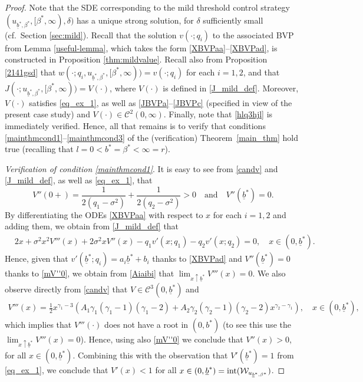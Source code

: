 \documentclass[11pt]{article} %
\def\ub{\underline{b}}
\numberwithin{komcounter}{section}
\begin{document}
\begin{proof} 
Note that the SDE corresponding to the mild threshold control strategy $(u_{\ub^*,\beta^*},[\beta^*,\infty),\delta)$ has a unique strong  solution, for $\delta$ sufficiently small (cf.~Section \ref{sec:mild}).
Recall that the solution $v(\cdot;q_i)$ to the associated BVP from Lemma \ref{useful-lemma}, which takes the form \eqref{XBVPaa}--\eqref{XBVPad}, is constructed in Proposition \ref{thm:mildvalue}. 
Recall also from Proposition \ref{2141gsd} that $w(\cdot;q_i,u_{\ub^*,\beta^*},[\beta^*,\infty)) = v(\cdot;q_i)$ for each $i=1,2$, and  
that $J(\cdot;u_{\ub^*,\beta^*},[\beta^*,\infty)) = V(\cdot)$, where $V(\cdot)$ is defined in \eqref{J_mild_def}. Moreover, $V(\cdot)$ satisfies \eqref{eq_ex_1}, as well as \eqref{JBVPa}--\eqref{JBVPc} (specified in view of the present case study) and $V(\cdot) \in \mathcal{C}^2(0,\infty)$. 
Finally, note that \eqref{hlq3hjl} is immediately verified. 
Hence, all that remains is to verify that conditions \eqref{mainthmcond1}--\eqref{mainthmcond3} of the (verification) Theorem~\ref{main_thm}  hold true (recalling that $l=0<b^*=\beta^*<\infty=r$).

\vspace{1mm}
{\it Verification of condition \eqref{mainthmcond1}}. 
It is easy to see from \eqref{candv}  and \eqref{J_mild_def}, as well as \eqref{eq_ex_1}, that 
\begin{equation} \label{mV''0}
V''(0+) = \frac{1}{2(q_1-\sigma^2)} + \frac{1}{2(q_2-\sigma^2)} > 0 
\quad \text{and} \quad 
V''(\ub^*) = 0.
\end{equation}
By differentiating the ODEs \eqref{XBVPaa} with respect to $x$ for each $i=1,2$ and adding them, we obtain from \eqref{J_mild_def} that 
\begin{align*}
&2x + \sigma^2 x^2 V'''(x) + 2 \sigma^2 x V''(x) - q_1 v'(x;q_1) - q_2 v'(x;q_2) = 0, \quad x \in (0,\ub^*).
\end{align*}
Hence, given that $v'(\ub^*;q_i) = a_i \ub^* + b_i$ thanks to \eqref{XBVPad} and $V''(\ub^*)=0$ thanks to \eqref{mV''0}, we obtain from \eqref{Aiaibi} that  
$\lim_{x \uparrow \ub^*} V'''(x) 
= 0$. 
We also observe directly from \eqref{candv} that $V \in \mathcal{C}^3(0,\ub^*)$ and 
\begin{align*}
V'''(x) = 
\tfrac{1}{2} x^{\gamma_1-3} \left( A_1\gamma_1(\gamma_1-1)(\gamma_1-2) + A_2\gamma_2(\gamma_2-1)(\gamma_2-2) x^{\gamma_2-\gamma_1}\right),  \quad x \in (0,\ub^*),
\end{align*}
which implies that $V'''(\cdot)$ does not have a root in $(0,b^*)$ (to see this use the $\lim_{x \uparrow \ub^*} V'''(x) 
= 0$). Hence, using also \eqref{mV''0} we conclude that 
$V''(x)>0$, for all $x \in (0,\ub^*)$.
Combining this with the observation that $V'(\ub^*) = 1$ from \eqref{eq_ex_1}, we conclude that $V'(x) < 1$ for all $x\in(0,\ub^*)={\rm int}(\mathcal{W}_{u_{\ub^*,\beta^*}})$.








\end{proof}
\end{document}
